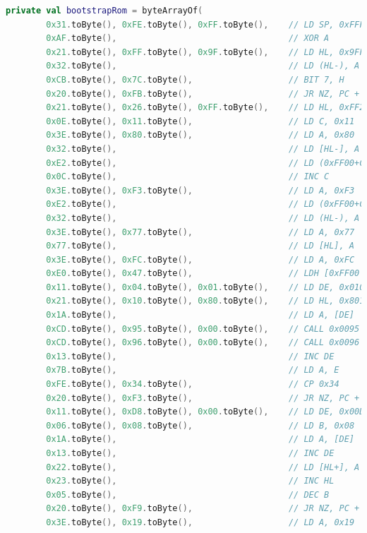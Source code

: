\begin{lstlisting}[language=Kotlin, caption={Secuencia de arranque y logo de Nintendo}, label={code:kotlinboot}]
    private val bootstrapRom = byteArrayOf(
        0x31.toByte(), 0xFE.toByte(), 0xFF.toByte(),    // LD SP, 0xFFFE
        0xAF.toByte(),                                  // XOR A
        0x21.toByte(), 0xFF.toByte(), 0x9F.toByte(),    // LD HL, 0x9FFF
        0x32.toByte(),                                  // LD (HL-), A
        0xCB.toByte(), 0x7C.toByte(),                   // BIT 7, H
        0x20.toByte(), 0xFB.toByte(),                   // JR NZ, PC + 0xFB
        0x21.toByte(), 0x26.toByte(), 0xFF.toByte(),    // LD HL, 0xFF26
        0x0E.toByte(), 0x11.toByte(),                   // LD C, 0x11
        0x3E.toByte(), 0x80.toByte(),                   // LD A, 0x80
        0x32.toByte(),                                  // LD [HL-], A
        0xE2.toByte(),                                  // LD (0xFF00+C), A
        0x0C.toByte(),                                  // INC C
        0x3E.toByte(), 0xF3.toByte(),                   // LD A, 0xF3
        0xE2.toByte(),                                  // LD (0xFF00+C), A
        0x32.toByte(),                                  // LD (HL-), A
        0x3E.toByte(), 0x77.toByte(),                   // LD A, 0x77
        0x77.toByte(),                                  // LD [HL], A
        0x3E.toByte(), 0xFC.toByte(),                   // LD A, 0xFC
        0xE0.toByte(), 0x47.toByte(),                   // LDH [0xFF00 + 0x47], A
        0x11.toByte(), 0x04.toByte(), 0x01.toByte(),    // LD DE, 0x0104
        0x21.toByte(), 0x10.toByte(), 0x80.toByte(),    // LD HL, 0x8010
        0x1A.toByte(),                                  // LD A, [DE]
        0xCD.toByte(), 0x95.toByte(), 0x00.toByte(),    // CALL 0x0095
        0xCD.toByte(), 0x96.toByte(), 0x00.toByte(),    // CALL 0x0096
        0x13.toByte(),                                  // INC DE
        0x7B.toByte(),                                  // LD A, E
        0xFE.toByte(), 0x34.toByte(),                   // CP 0x34
        0x20.toByte(), 0xF3.toByte(),                   // JR NZ, PC + 0xF3
        0x11.toByte(), 0xD8.toByte(), 0x00.toByte(),    // LD DE, 0x00D8
        0x06.toByte(), 0x08.toByte(),                   // LD B, 0x08
        0x1A.toByte(),                                  // LD A, [DE]
        0x13.toByte(),                                  // INC DE
        0x22.toByte(),                                  // LD [HL+], A
        0x23.toByte(),                                  // INC HL
        0x05.toByte(),                                  // DEC B
        0x20.toByte(), 0xF9.toByte(),                   // JR NZ, PC + 0xF9
        0x3E.toByte(), 0x19.toByte(),                   // LD A, 0x19

\end{lstlisting}
